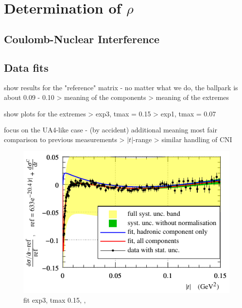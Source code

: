 \section{Determination of $\rho$}
\label{sec:rho}

\subsection{Coulomb-Nuclear Interference}
\label{sec:rho cni}


\subsection{Data fits}
\label{sec:rho anal}


\bgroup
\parskip=0pt

\> show results for the "reference" matrix - no matter what we do, the ballpark is about 0.09 - 0.10
\>> meaning of the components
\>> meaning of the extremes

\> show plots for the extremes
\>> exp3, tmax = 0.15
\>> exp1, tmax = 0.07

\> focus on the UA4-like case - (by accident) additional meaning most fair comparison to previous measurements
\>> $|t|$-range
\>> similar handling of CNI

\egroup

\begin{figure}
\vskip-5mm
\begin{center}
\includegraphics{fig/fit_details_exp3_0p15.pdf}
\caption{%
fit exp3, tmax 0.15,
,
}
\label{fig:fit exp3 0.15}
\end{center}
\end{figure}


